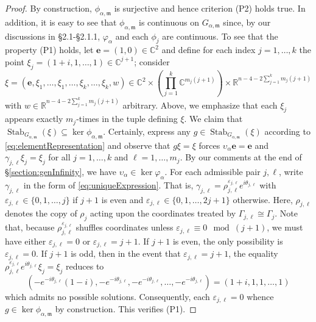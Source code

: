 \documentclass[10pt, reqno]{amsart}
\newcommand{\RR}{\mathbb{R}}
\newcommand{\CC}{\mathbb{C}}
\newcommand{\m}{\mathfrak{m}}
\renewcommand{\epsilon}{\varepsilon}
\numberwithin{equation}{section}
\theoremstyle{definition}
\theoremstyle{remark}
\theoremstyle{plain}
\begin{document}
\begin{proof}
		
		By construction, $\phi_{\alpha,\m}$ is surjective and hence criterion (P2) holds true. In addition, it is easy to see that $\phi_{\alpha,\m}$ is continuous on $G_{\alpha,\m}$ since, by our discussions in \S2.1-\S2.1.1, $\varphi_\alpha$ and each $\phi_j$ are continuous. To see that the property (P1) holds, let $\mathbf{e} = (1,0) \in \CC^2$ and define for each index $j=1,\dots,k$ the point $\xi_{j} = (1+i,1,\dots,1) \in \CC^{j+1}$; consider 
		\begingroup
		\small
		\[
		\xi = (\mathbf{e}, \xi_{1}, \dots, \xi_{1}, \dots, \xi_{k}, \dots, \xi_{k}, w) \in \CC^2 \times\left(\prod_{j=1}^k\CC^{m_j(j+1)}\right)\times \RR^{n-4-2\sum_{j=1}^k m_j(j+1)}
		\]
		\endgroup
		with $w \in \RR^{n-4-2\sum_{j=1}^k m_j (j+1)}$ arbitrary. Above, we emphasize that each $\xi_{j}$ appears exactly $m_j$-times in the tuple defining $\xi$. We claim that $\operatorname{Stab}_{G_{\alpha,\m}}(\xi) \subseteq \ker{\phi_{\alpha,\m}}$. Certainly, express any  $g \in \operatorname{Stab}_{G_{\alpha,\m}}(\xi) $ according to \eqref{eq:elementRepresentation} and observe that $g \xi = \xi$ forces $\upsilon_\alpha \mathbf{e} = \mathbf{e}$ and $\gamma_{j,\ell} \xi_{j} = \xi_{j}$ for all $j  = 1,\dots, k$ and $\ell=1,\dots, m_j$. By our comments at the end of \S\ref{section:genInfinity}, we have $\upsilon_\alpha \in \ker{\varphi_\alpha}$. For each admissible pair $j,\ell$, write $\gamma_{j,\ell}$ in the form of \eqref{eq:uniqueExpression}. That is, $\gamma_{j,\ell} = \rho_{j,\ell}^{\epsilon_{j,\ell}} e^{i\theta_{j,\ell}}$ with $\epsilon_{j,\ell} \in \{0,1, \dots, j\}$ if $j+1$ is even and $\epsilon_{j,\ell} \in \{0,1,\dots,2j+1\}$ otherwise. Here, $\rho_{j,\ell}$ denotes the copy of $\rho_j$ acting upon the coordinates treated by $\Gamma_{j,\ell} \cong \Gamma_j$. Note that, because $\rho_{j,\ell}^{\epsilon_{j,\ell}}$ shuffles coordinates unless $\epsilon_{j,\ell} \equiv 0 \mod{(j+1)}$, we must have either $\epsilon_{j,\ell} = 0$ or $\epsilon_{j,\ell} = j+1$. If $j+1$ is even, the only possibility is $\epsilon_{j,\ell} = 0$. If $j+1$ is odd, then in the event that $\epsilon_{j,\ell} = j+1$, the equality $\rho_{j,\ell}^{\epsilon_{j,\ell}} e^{i\theta_{j,\ell}} \xi_{j} = \xi_{j}$ reduces to 
		\[
		\left( -e^{-i\theta_{j,\ell}} (1-i), -e^{-i\theta_{j,\ell}},-e^{-i\theta_{j,\ell}},\dots,-e^{-i\theta_{j,\ell}} \right) = (1+i,1,1,\dots,1)
		\]
		which admits no possible solutions. Consequently, each $\epsilon_{j,\ell} =0$ whence $g \in \ker{\phi_{\alpha,\m}}$ by construction. This verifies (P1). 
		

\end{proof}
\end{document}
